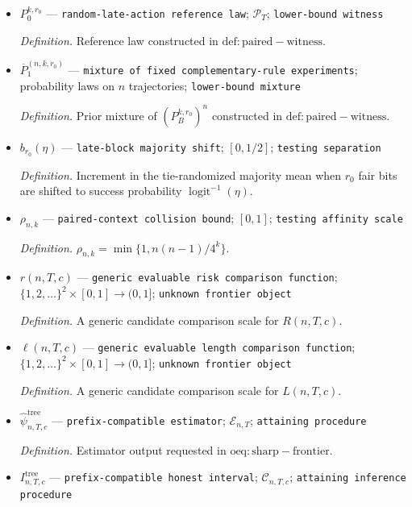 \documentclass{article}
\begin{document}
\begin{itemize}
  \par\smallskip\noindent\emph{Definition.} Fixed law constructed in \(\mathrm{def:paired-witness}\).
  \item \(P_0^{k,r_0}\) --- \texttt{random-\allowbreak{}late-\allowbreak{}action reference law}; \(\mathcal P_T\); \texttt{lower-\allowbreak{}bound witness}
  \par\smallskip\noindent\emph{Definition.} Reference law constructed in \(\mathrm{def:paired-witness}\).
  \item \(\overline P_1^{(n,k,r_0)}\) --- \texttt{mixture of fixed complementary-\allowbreak{}rule experiments}; probability laws on \(n\) trajectories; \texttt{lower-\allowbreak{}bound mixture}
  \par\smallskip\noindent\emph{Definition.} Prior mixture of \((P_B^{k,r_0})^n\) constructed in \(\mathrm{def:paired-witness}\).
  \item \(b_{r_0}(\eta)\) --- \texttt{late-\allowbreak{}block majority shift}; \([0,1/2]\); \texttt{testing separation}
  \par\smallskip\noindent\emph{Definition.} Increment in the tie-randomized majority mean when \(r_0\) fair bits are shifted to success probability \(\operatorname{logit}^{-1}(\eta)\).
  \item \(\rho_{n,k}\) --- \texttt{paired-\allowbreak{}context collision bound}; \([0,1]\); \texttt{testing affinity scale}
  \par\smallskip\noindent\emph{Definition.} \(\rho_{n,k}=\min\{1,n(n-1)/4^k\}\).
  \item \(r(n,T,c)\) --- \texttt{generic evaluable risk comparison function}; \(\{1,2,\ldots\}^2\times[0,1]\to(0,1]\); \texttt{unknown frontier object}
  \par\smallskip\noindent\emph{Definition.} A generic candidate comparison scale for \(R(n,T,c)\).
  \item \(\ell(n,T,c)\) --- \texttt{generic evaluable length comparison function}; \(\{1,2,\ldots\}^2\times[0,1]\to(0,1]\); \texttt{unknown frontier object}
  \par\smallskip\noindent\emph{Definition.} A generic candidate comparison scale for \(L(n,T,c)\).
  \item \(\widehat\psi^{\mathrm{tree}}_{n,T,c}\) --- \texttt{prefix-\allowbreak{}compatible estimator}; \(\mathcal E_{n,T}\); \texttt{attaining procedure}
  \par\smallskip\noindent\emph{Definition.} Estimator output requested in \(\mathrm{oeq:sharp-frontier}\).
  \item \(I^{\mathrm{tree}}_{n,T,c}\) --- \texttt{prefix-\allowbreak{}compatible honest interval}; \(\mathcal C_{n,T,c}\); \texttt{attaining inference procedure}

\end{itemize}
\end{document}
